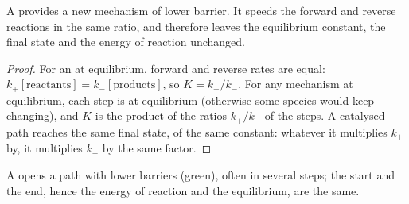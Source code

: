 \begin{proposition}\label{prop:b1:elementary-steps:catalysis}
A  provides a new mechanism of lower barrier. It speeds the
forward and reverse reactions in the same ratio, and therefore leaves the
equilibrium constant, the final state and the energy of reaction
unchanged.
\end{proposition}

\begin{proof}
For an  at equilibrium, forward and reverse rates are
equal: $k_+[\text{reactants}] = k_-[\text{products}]$, so $K = k_+/k_-$.
For any mechanism at equilibrium, each step is at equilibrium (otherwise
some species would keep changing), and $K$ is the product of the ratios
$k_+/k_-$ of the steps. A catalysed path reaches the same final state,
of the same constant: whatever it multiplies $k_+$ by, it multiplies $k_-$
by the same factor.
\end{proof}

\begin{omfigure}

{\small A  opens a path with lower barriers (green), often in
several steps; the start and the end, hence the energy of reaction and
the equilibrium, are the same.}
\end{omfigure}

